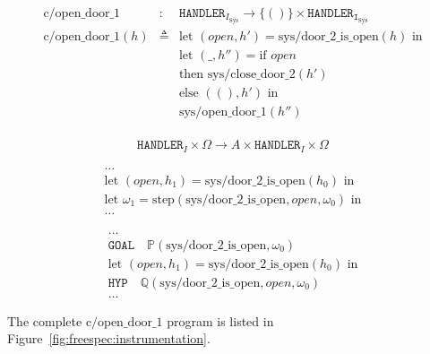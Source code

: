 \[
  \begin{array}{rcl}
    \mathrm{c/open\_door\_1}
    & :
    & \mathtt{HANDLER}_{I_{\mathrm{Sys}}} \rightarrow \{()\} \times
      \mathtt{HANDLER_{I_{\mathrm{Sys}}}} \\
    \mathrm{c/open\_door\_1}(h)
    & \triangleq
    & \text{let } (\mathit{open}, h') = \mathrm{sys/door\_2\_is\_open}(h) \text{ in} \\

    &
    & \text{let }(\_, h'') = \text{if }\mathit{open} \\

    &
    & \text{then }\mathrm{sys/close\_door\_2}(h') \\

    &
    & \text{else }((), h') \text{ in} \\

    &
    & \mathrm{sys/open\_door\_1}(h'')\\
  \end{array}
\]

\[
  \mathtt{HANDLER}_I \times \Omega \rightarrow A \times \mathtt{HANDLER}_I
  \times \Omega
\]

\[
  \begin{array}{l}
    \dots \\
    \text{let } (\mathit{open}, h_1) = \mathrm{sys/door\_2\_is\_open}(h_0) \text{ in} \\
    \text{let }\omega_1 = \mathrm{step}(\mathrm{sys/door\_2\_is\_open},
    \mathit{open}, \omega_0) \text{ in} \\
    \dots
  \end{array}
\]

\[
  \begin{array}{l}
    \dots \\
    \mathtt{GOAL} \quad \mathbb{P}(\mathrm{sys/door\_2\_is\_open}, \omega_0) \\
    \text{let } (\mathit{open}, h_1) = \mathrm{sys/door\_2\_is\_open}(h_0) \text{ in} \\
    \mathtt{HYP} \quad \mathbb{Q}(\mathrm{sys/door\_2\_is\_open}, open, \omega_0) \\
    \dots
  \end{array}
\]

The complete $\mathrm{c/open\_door\_1}$ program is listed in
Figure~\ref{fig:freespec:instrumentation}.

